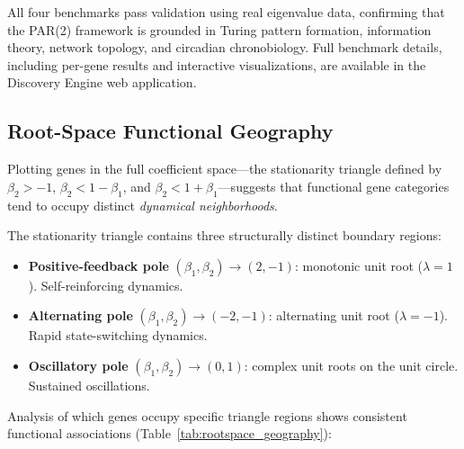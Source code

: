 \documentclass[11pt,a4paper]{article}
\begin{document}
All four benchmarks pass validation using real eigenvalue data, confirming that the PAR(2) framework is grounded in Turing pattern formation, information theory, network topology, and circadian chronobiology. Full benchmark details, including per-gene results and interactive visualizations, are available in the Discovery Engine web application.

\subsection{Root-Space Functional Geography}

Plotting genes in the full coefficient space---the stationarity triangle defined by $\beta_2 > -1$, $\beta_2 < 1 - \beta_1$, and $\beta_2 < 1 + \beta_1$---suggests that functional gene categories tend to occupy distinct \textit{dynamical neighborhoods}.

The stationarity triangle contains three structurally distinct boundary regions:
\begin{itemize}[noitemsep]
    \item \textbf{Positive-feedback pole} $(\beta_1, \beta_2) \rightarrow (2, -1)$: monotonic unit root ($\lambda = 1$). Self-reinforcing dynamics.
    \item \textbf{Alternating pole} $(\beta_1, \beta_2) \rightarrow (-2, -1)$: alternating unit root ($\lambda = -1$). Rapid state-switching dynamics.
    \item \textbf{Oscillatory pole} $(\beta_1, \beta_2) \rightarrow (0, 1)$: complex unit roots on the unit circle. Sustained oscillations.
\end{itemize}

Analysis of which genes occupy specific triangle regions shows consistent functional associations (Table~\ref{tab:rootspace_geography}):
\end{document}
